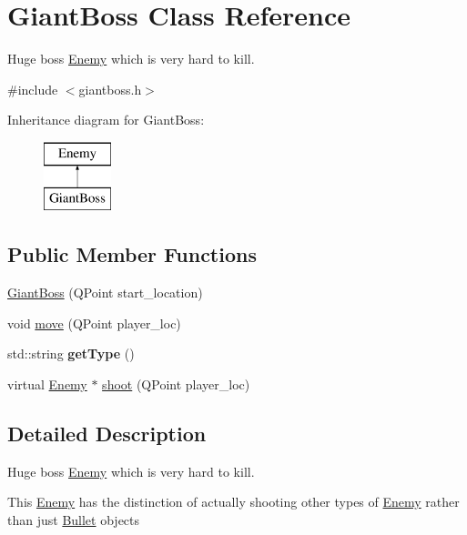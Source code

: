 \hypertarget{classGiantBoss}{
\section{GiantBoss Class Reference}
\label{classGiantBoss}
}


Huge boss \hyperlink{classEnemy}{Enemy} which is very hard to kill.  




{\ttfamily \#include $<$giantboss.h$>$}

Inheritance diagram for GiantBoss:\begin{figure}[H]
\begin{center}
\leavevmode
\includegraphics[height=2.000000cm]{classGiantBoss}
\end{center}
\end{figure}
\subsection*{Public Member Functions}
\begin{DoxyCompactItemize}
\item 
\hyperlink{classGiantBoss_a64caa2ac5183d3e08934c5242fad48d1}{GiantBoss} (QPoint start\_\-location)
\item 
void \hyperlink{classGiantBoss_aa11f7cf74faeac897e27ba94ee54bcfb}{move} (QPoint player\_\-loc)
\item 
\hypertarget{classGiantBoss_a6e9a0e6c616a7dab0e5b6adb4bdea8ef}{
std::string {\bfseries getType} ()}
\label{classGiantBoss_a6e9a0e6c616a7dab0e5b6adb4bdea8ef}

\item 
virtual \hyperlink{classEnemy}{Enemy} $\ast$ \hyperlink{classGiantBoss_a6c7d445cbdab74bc58ad8166ceed12fa}{shoot} (QPoint player\_\-loc)
\end{DoxyCompactItemize}


\subsection{Detailed Description}
Huge boss \hyperlink{classEnemy}{Enemy} which is very hard to kill. 

This \hyperlink{classEnemy}{Enemy} has the distinction of actually shooting other types of \hyperlink{classEnemy}{Enemy} rather than just \hyperlink{classBullet}{Bullet} objects 

